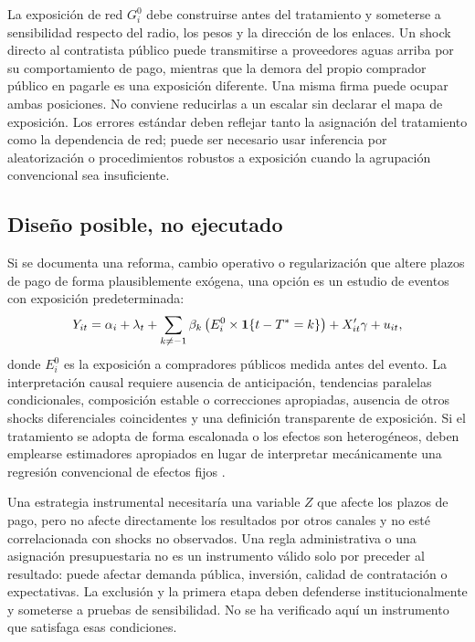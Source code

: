 \documentclass[11pt,a4paper]{article}
\begin{document}
La exposición de red $G_i^0$ debe construirse antes del tratamiento y someterse a sensibilidad respecto del radio, los pesos y la dirección de los enlaces. Un shock directo al contratista público puede transmitirse a proveedores aguas arriba por su comportamiento de pago, mientras que la demora del propio comprador público en pagarle es una exposición diferente. Una misma firma puede ocupar ambas posiciones. No conviene reducirlas a un escalar sin declarar el mapa de exposición. Los errores estándar deben reflejar tanto la asignación del tratamiento como la dependencia de red; puede ser necesario usar inferencia por aleatorización o procedimientos robustos a exposición cuando la agrupación convencional sea insuficiente.

\subsection{Diseño posible, no ejecutado}
Si se documenta una reforma, cambio operativo o regularización que altere plazos de pago de forma plausiblemente exógena, una opción es un estudio de eventos con exposición predeterminada:
\begin{equation}
Y_{it}=\alpha_i+\lambda_t+\sum_{k\neq-1}\beta_k\left(E_i^0\times\mathbf 1\{t-T^*=k\}\right)+X_{it}'\gamma+u_{it}, \label{eq:eventstudy}
\end{equation}
donde $E_i^0$ es la exposición a compradores públicos medida antes del evento. La interpretación causal requiere ausencia de anticipación, tendencias paralelas condicionales, composición estable o correcciones apropiadas, ausencia de otros shocks diferenciales coincidentes y una definición transparente de exposición. Si el tratamiento se adopta de forma escalonada o los efectos son heterogéneos, deben emplearse estimadores apropiados en lugar de interpretar mecánicamente una regresión convencional de efectos fijos \citep{callaway2021,sun2021,baker2026}.

Una estrategia instrumental necesitaría una variable $Z$ que afecte los plazos de pago, pero no afecte directamente los resultados por otros canales y no esté correlacionada con shocks no observados. Una regla administrativa o una asignación presupuestaria no es un instrumento válido solo por preceder al resultado: puede afectar demanda pública, inversión, calidad de contratación o expectativas. La exclusión y la primera etapa deben defenderse institucionalmente y someterse a pruebas de sensibilidad. No se ha verificado aquí un instrumento que satisfaga esas condiciones.
\end{document}
